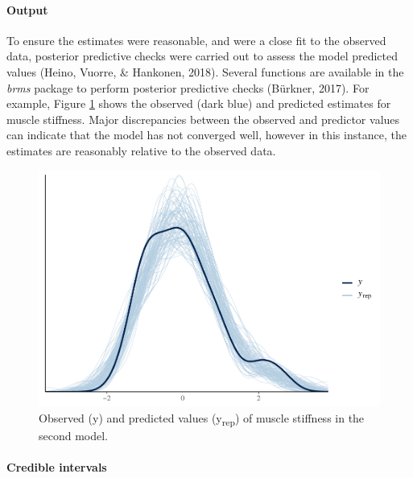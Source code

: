 \documentclass[man,floatsintext]{apa6}
\let\oldparagraph\paragraph
\renewcommand{\paragraph}[1]{\oldparagraph{#1}\mbox{}}
\begin{document}
\hypertarget{output}{%
\paragraph{Output}\label{output}}

To ensure the estimates were reasonable, and were a close fit to the observed data, posterior predictive checks were carried out to assess the model predicted values (Heino, Vuorre, \& Hankonen, 2018).
Several functions are available in the \emph{brms} package to perform posterior predictive checks (Bürkner, 2017).
For example, Figure \ref{fig:ppcheck} shows the observed (dark blue) and predicted estimates for muscle stiffness. Major discrepancies between the observed and predictor values can indicate that the model has not converged well, however in this instance, the estimates are reasonably relative to the observed data.

\begin{figure}

{\centering \includegraphics{full_phd_files/figure-latex/ppcheck-1} 

}

\caption{Observed (y) and predicted values (y\textsubscript{rep}) of muscle stiffness in the second model.}\label{fig:ppcheck}
\end{figure}

\hypertarget{credible-intervals}{%
\paragraph{Credible intervals}\label{credible-intervals}}
\end{document}
